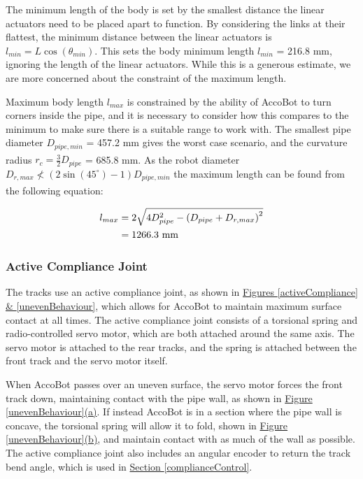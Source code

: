 \documentclass[11pt]{article}		%
\newcommand{\supercite}[1]{\textsuperscript{\cite{#1}}}		%
\newcommand{\sectref}[1]{\hyperref[#1]{Section \ref*{#1}}}     %
\begin{document}
    			The minimum length of the body is set by the smallest distance the linear actuators need to be placed apart to function.
    			By considering the links at their flattest, the minimum distance between the linear actuators is $l_{min} = L \cos \left( \theta_{min} \right)$.
    			This sets the body minimum length $l_{min}$ =  216.8 mm, ignoring the length of the linear actuators.
    			While this is a generous estimate, we are more concerned about the constraint of the maximum length.
    			
    			Maximum body length $l_{max}$ is constrained by the ability of AccoBot to turn corners inside the pipe, and it is necessary to consider how this compares to the minimum to make sure there is a suitable range to work with.
    			The smallest pipe diameter $D_{pipe,min}$ = 457.2 mm gives the worst case scenario, and the curvature radius $r_c = \frac{3}{2} D_{pipe}$\supercite{roh2005differential} = 685.8 mm.
    			As the robot diameter $D_{r,max} \nless \left( 2 \sin \left( 45^\circ \right) - 1 \right) D_{pipe,min}$ the maximum length can be found from the following equation\supercite{roh2005differential}:
    
    			\begin{align}
    				l_{max} &= 2 \sqrt{4D_{pipe}^2 - \left( D_{pipe} + D_{r,max}\right) ^ 2}
    				\\
    				&= 1266.3 \ \mathrm{mm} \notag
    			\end{align}
			
			\subsubsection{Active Compliance Joint}
			
				The tracks use an active compliance joint, as shown in \hyperref[activeCompliance]{Figures \ref*{activeCompliance} \& \ref*{unevenBehaviour}}, which allows for AccoBot to maintain maximum surface contact at all times.
				The active compliance joint consists of a torsional spring and radio-controlled servo motor, which are both attached around the same axis.
				The servo motor is attached to the rear tracks, and the spring is attached between the front track and the servo motor itself.
				
				When AccoBot passes over an uneven surface, the servo motor forces the front track down, maintaining contact with the pipe wall, as shown in \hyperref[unevenBehaviour]{Figure \ref*{unevenBehaviour}(a)}.
				If instead AccoBot is in a section where the pipe wall is concave, the torsional spring will allow it to fold, shown in \hyperref[unevenBehaviour]{Figure \ref*{unevenBehaviour}(b)}, and maintain contact with as much of the wall as possible.
				The active compliance joint also includes an angular encoder to return the track bend angle, which is used in \sectref{complianceControl}.
							
\end{document}
